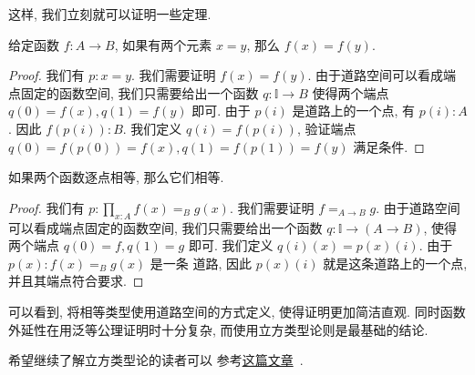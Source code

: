 这样, 我们立刻就可以证明一些定理.

\begin{theorem}
给定函数 \(f : A \to B\), 如果有两个元素 \(x = y\), 那么
\(f(x) = f(y)\).
\end{theorem}
\begin{proof}
我们有 \(p : x = y\). 我们需要证明 \(f(x) = f(y)\).
由于道路空间可以看成端点固定的函数空间, 我们只需要给出一个函数
\(q : \mathbb I \to B\) 使得两个端点 \(q(0) = f(x),
q(1) = f(y)\) 即可. 由于 \(p(i)\) 是道路上的一个点, 有
\(p(i) : A\). 因此 \(f(p(i)) : B\). 我们定义 \(q(i) = f(p(i))\),
验证端点 \(q(0) = f(p(0)) = f(x), q(1) = f(p(1)) = f(y)\)
满足条件.
\end{proof}

\begin{theorem}
如果两个函数逐点相等, 那么它们相等.
\end{theorem}
\begin{proof}
我们有 \(p : \prod_{x : A} f(x) =_B g(x)\). 我们需要证明
\(f =_{A\to B} g\). 由于道路空间可以看成端点固定的函数空间,
我们只需要给出一个函数 \(q : \mathbb I \to (A \to B)\), 使得
两个端点 \(q(0) = f, q(1) = g\) 即可. 我们定义
\(q(i)(x) = p(x)(i)\). 由于 \(p(x) : f(x) =_B g(x)\) 是一条
道路, 因此 \(p(x)(i)\) 就是这条道路上的一个点, 并且其端点符合要求.
\end{proof}

可以看到, 将相等类型使用道路空间的方式定义, 使得证明更加简洁直观.
同时函数外延性在用泛等公理证明时十分复杂, 而使用立方类型论则是最基础的结论.


希望继续了解立方类型论的读者可以
参考\href{https://1lab.dev/1Lab.intro.html}{这篇文章}~\cite{amelia:2023:1lab}.
